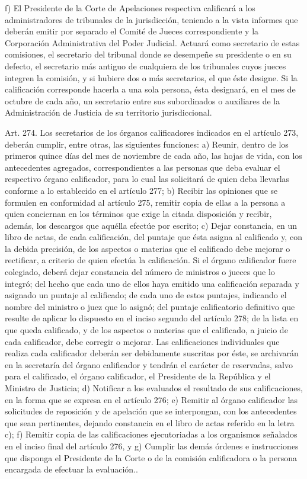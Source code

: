     f) El Presidente de la Corte de Apelaciones respectiva calificará a los administradores de tribunales de la jurisdicción, teniendo a la vista informes que deberán emitir por separado el Comité de Jueces correspondiente y la Corporación Administrativa del Poder Judicial.
    Actuará como secretario de estas comisiones, el secretario del tribunal donde se desempeñe su presidente o en su defecto, el secretario más antiguo de cualquiera de los tribunales cuyos jueces integren la comisión, y si hubiere dos o más secretarios, el que éste designe. Si la calificación corresponde hacerla a una sola persona, ésta designará, en el mes de octubre de cada año, un secretario entre sus subordinados o auxiliares de la Administración de Justicia de su territorio jurisdiccional.



    Art. 274. Los secretarios de los órganos calificadores indicados en el artículo 273, deberán cumplir, entre otras, las siguientes funciones:
    a) Reunir, dentro de los primeros quince días del mes de noviembre de cada año, las hojas de vida, con los antecedentes agregados, correspondientes a las personas que deba evaluar el respectivo órgano calificador, para lo cual las solicitará de quien deba llevarlas conforme a lo establecido en el artículo 277;
    b) Recibir las opiniones que se formulen en conformidad al artículo 275, remitir copia de ellas a la persona a quien conciernan en los términos que exige la citada disposición y recibir, además, los descargos que aquélla efectúe por escrito;
    c) Dejar constancia, en un libro de actas, de cada calificación, del puntaje que ésta asigna al calificado y, con la debida precisión, de los aspectos o materias que el calificado debe mejorar o rectificar, a criterio de quien efectúa la calificación. Si el órgano calificador fuere colegiado, deberá dejar constancia del número de ministros o jueces que lo integró; del hecho que cada uno de ellos haya emitido una calificación separada y asignado un puntaje al calificado; de cada uno de estos puntajes, indicando el nombre del ministro o juez que lo asignó; del puntaje calificatorio definitivo que resulte de aplicar lo dispuesto en el inciso segundo del artículo 278; de la lista en que queda calificado, y de los aspectos o materias que el calificado, a juicio de cada calificador, debe corregir o mejorar.
    Las calificaciones individuales que realiza cada calificador deberán ser debidamente suscritas por éste, se archivarán en la secretaría del órgano calificador y tendrán el carácter de reservadas, salvo para el calificado, el órgano calificador, el Presidente de la República y el Ministro de Justicia;
    d) Notificar a los evaluados el resultado de sus calificaciones, en la forma que se expresa en el artículo 276;
    e) Remitir al órgano calificador las solicitudes de reposición y de apelación que se interpongan, con los antecedentes que sean pertinentes, dejando constancia en el libro de actas referido en la letra c);
    f) Remitir copia de las calificaciones ejecutoriadas a los organismos señalados en el inciso final del artículo 276, y
    g) Cumplir las demás órdenes e instrucciones que disponga el Presidente de la Corte o de la comisión calificadora o la persona encargada de efectuar la evaluación..


